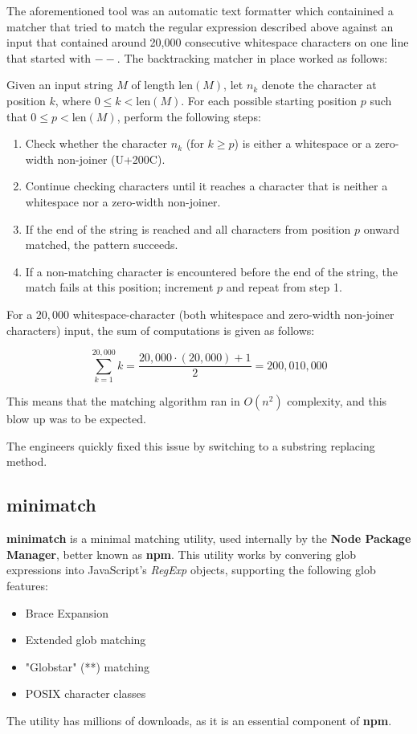 The aforementioned tool was an automatic text formatter which containined a matcher that tried to match the regular expression described above against an input that contained around 20,000 consecutive whitespace characters on one line that started with $--$.
The backtracking matcher in place worked as follows:

Given an input string $M$ of length $\text{len}(M)$, let $n_k$ denote the character at position $k$, where $0 \leq k < \text{len}(M)$. For each possible starting position $p$ such that $0 \leq p < \text{len}(M)$, perform the following steps:

\begin{enumerate}
	\item Check whether the character $n_k$ (for $k \geq p$) is either a whitespace or a zero-width non-joiner (U+200C).
	\item Continue checking characters until it reaches a character that is neither a whitespace nor a zero-width non-joiner.
	\item If the end of the string is reached and all characters from position $p$ onward matched, the pattern succeeds.
	\item If a non-matching character is encountered before the end of the string, the match fails at this position; increment $p$ and repeat from step 1.
\end{enumerate}

For a $20{,}000$ whitespace-character (both whitespace and zero-width non-joiner characters) input, the sum of computations is given as follows:

\begin{center}
	\[ \sum_{k=1}^{20,000} k = \frac{20,000 \cdot (20,000) + 1}{2} = 200,010,000 \]
\end{center}

This means that the matching algorithm ran in $O(n^2)$ complexity, and this blow up was to be expected.

The engineers quickly fixed this issue by switching to a substring replacing method.

\subsection{minimatch}
\textbf{minimatch} is a minimal matching utility, used internally by the \textbf{Node Package Manager}, better known as \textbf{npm}. \cite{npm_minimatch}
This utility works by convering glob expressions into JavaScript's \textit{RegExp} objects, supporting the following glob features:
\begin{itemize}
	\item Brace Expansion
	\item Extended glob matching
	\item "Globstar" (**) matching
	\item POSIX character classes
\end{itemize}
The utility has millions of downloads, as it is an essential component of \textbf{npm}.

